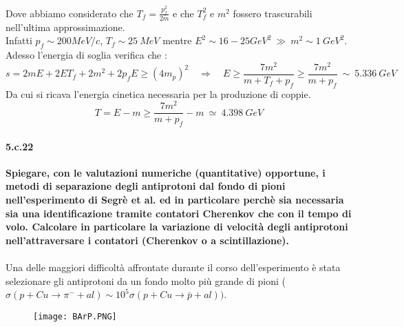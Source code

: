 \documentclass[twoside]{article}
\begin{document}
Dove abbiamo considerato che $T_f=\frac{p_f^2}{2m}$ e che $T_f^2$ e $m^2$ fossero trascurabili nell'ultima approssimazione.\\
Infatti $p_f\sim 200 MeV/c$, $T_f \sim 25 \ MeV$ mentre $E^2 \sim 16-25 GeV^2 \ \gg \ m^2 \sim 1 \ GeV^2 $.\\
Adesso l'energia di soglia verifica che :
\begin{equation}
    s=2mE+2ET_f+2m^2+2p_fE\geq(4m_p)^2\quad\Rightarrow\quad E\geq\frac{7m^2}{m+T_f+p_f}\geq\frac{7m^2}{m+p_f} \ \sim \ 5.336 \ GeV
\end{equation}
Da cui si ricava l'energia cinetica necessaria per la produzione di coppie.
\begin{equation}
    T=E-m\geq\frac{7m^2}{m+p_f}-m \ \simeq \ 4.398 \ GeV
\end{equation}

\paragraph{5.c.22}\textbf{Spiegare, con le valutazioni numeriche (quantitative) opportune, i metodi di separazione degli antiprotoni dal fondo di pioni nell’esperimento di Segrè et al. ed in particolare perchè sia necessaria sia una identificazione tramite contatori Cherenkov che con il tempo di volo. Calcolare in particolare la variazione di velocità degli antiprotoni nell'attraversare i contatori (Cherenkov o a scintillazione).}\\
\\
Una delle maggiori difficoltà affrontate durante il corso dell'esperimento è stata selezionare gli antiprotoni da un fondo molto più grande di pioni ($\sigma(p+Cu\to\pi^{-}+al)\sim 10^5\sigma(p+Cu\to\bar{p}+al))$.\\

\begin{figure}[H]
    \centering
    \texttt{[image: BArP.PNG]}
    \label{fig:BarP}
\end{figure}
\end{document}
